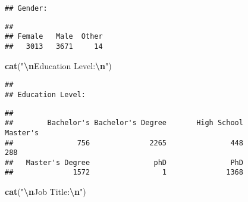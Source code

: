 \documentclass[
]{article}
\newenvironment{Shaded}{\begin{snugshade}}{\end{snugshade}}
\newcommand{\FunctionTok}[1]{\textcolor[rgb]{0.13,0.29,0.53}{\textbf{#1}}}
\newcommand{\NormalTok}[1]{#1}
\newcommand{\SpecialCharTok}[1]{\textcolor[rgb]{0.81,0.36,0.00}{\textbf{#1}}}
\newcommand{\StringTok}[1]{\textcolor[rgb]{0.31,0.60,0.02}{#1}}
\begin{document}
\begin{verbatim}
## Gender:
\end{verbatim}

\begin{Shaded}
\end{Shaded}

\begin{verbatim}
## 
## Female   Male  Other 
##   3013   3671     14
\end{verbatim}

\begin{Shaded}
\begin{Highlighting}[]
\FunctionTok{cat}\NormalTok{(}\StringTok{"}\SpecialCharTok{\textbackslash{}n}\StringTok{Education Level:}\SpecialCharTok{\textbackslash{}n}\StringTok{"}\NormalTok{)}
\end{Highlighting}
\end{Shaded}

\begin{verbatim}
## 
## Education Level:
\end{verbatim}

\begin{Shaded}
\end{Shaded}

\begin{verbatim}
## 
##        Bachelor's Bachelor's Degree       High School          Master's 
##               756              2265               448               288 
##   Master's Degree               phD               PhD 
##              1572                 1              1368
\end{verbatim}

\begin{Shaded}
\begin{Highlighting}[]
\FunctionTok{cat}\NormalTok{(}\StringTok{"}\SpecialCharTok{\textbackslash{}n}\StringTok{Job Title:}\SpecialCharTok{\textbackslash{}n}\StringTok{"}\NormalTok{)}
\end{Highlighting}
\end{Shaded}
\end{document}
